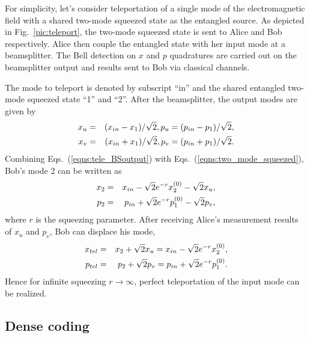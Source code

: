 \documentclass[%
 reprint,
groupedaddress,
showpacs,
 amsmath,amssymb,
 aps,
prb,
]{revtex4-1}
\begin{document}
		For simplicity, let's consider teleportation of a single mode of the electromagnetic field with a shared two-mode squeezed state as the entangled source. As depicted in Fig.~\ref{pic:teleport}, the two-mode squeezed state is sent to Alice and Bob respectively. Alice then couple the entangled state with her input mode at a beamsplitter. The Bell detection on $x$ and $p$ quadratures are carried out on the beamsplitter output and results sent to Bob via classical channels.

		The mode to teleport is denoted by subscript ``in'' and the shared entangled two-mode squeezed state ``1'' and ``2''. After the beamsplitter, the output modes are given by
		\begin{eqnarray}
		\label{eqns:tele_BSoutput}
			x_u &=& (x_{in}-x_1)/\sqrt2, p_u = (p_{in} - p_1)/\sqrt2, \notag \\
			x_v &=& (x_{in} + x_1)/\sqrt2, p_v = (p_{in} +p_1)/\sqrt2.
		\end{eqnarray}
		Combining Eqs.~(\ref{eqns:tele_BSoutput}) with Eqs.~(\ref{eqns:two_mode_squeezed}), Bob's mode 2 can be written as
		\begin{eqnarray}
		x_2 &=& x_{in} - \sqrt2 e^{-r} x_2^{(0)} -\sqrt2 x_u,\notag\\
		p_2 &=& p_{in} + \sqrt2 e^{-r} p_1^{(0)} - \sqrt2 p_v,
		\end{eqnarray}
		where $r$ is the squeezing parameter. After receiving Alice's measurement results of $x_u$ and $p_v $, Bob can displace his mode,
		\begin{eqnarray}
		x_{tel} &=& x_2 + \sqrt2 x_u = x_{in} - \sqrt2 e^{-r} x_2^{(0)},\notag\\
		p_{tel} &=& p_2 + \sqrt2 p_v = p_{in} + \sqrt2 e^{-r} p_1^{(0)}.
		\end{eqnarray}
		Hence for infinite squeezing $r\rightarrow \infty$, perfect teleportation of the input mode can be realized.
		
	

	\subsection{Dense coding} %
	\label{sub:dense_coding}
\end{document}
